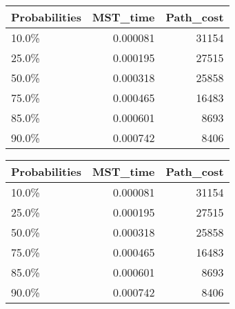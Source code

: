 \begin{tabular}{lrr}
\toprule
Probabilities &  MST\_time &  Path\_cost \\
\midrule
        10.0\% &  0.000081 &      31154 \\
        25.0\% &  0.000195 &      27515 \\
        50.0\% &  0.000318 &      25858 \\
        75.0\% &  0.000465 &      16483 \\
        85.0\% &  0.000601 &       8693 \\
        90.0\% &  0.000742 &       8406 \\
\bottomrule
\end{tabular}
\begin{tabular}{|l|r|r|}
\toprule \hline
Probabilities &  MST\_time &  Path\_cost \\ \hline

\midrule
        10.0\% &  0.000081 &      31154 \\ \hline

        25.0\% &  0.000195 &      27515 \\ \hline

        50.0\% &  0.000318 &      25858 \\ \hline

        75.0\% &  0.000465 &      16483 \\ \hline

        85.0\% &  0.000601 &       8693 \\ \hline

        90.0\% &  0.000742 &       8406 \\ \hline

\bottomrule
\end{tabular}
